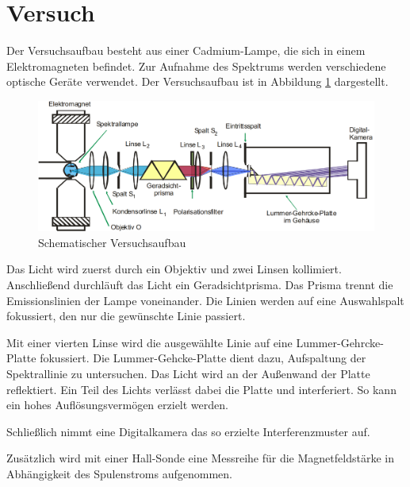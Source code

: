 \section{Versuch}

Der Versuchsaufbau besteht aus einer Cadmium-Lampe, die sich in einem Elektromagneten befindet.
Zur Aufnahme des Spektrums werden verschiedene optische Geräte verwendet.
Der Versuchsaufbau ist in Abbildung \ref{fig:aufbau} dargestellt.

\begin{figure}
	\centering
	\includegraphics[width=\textwidth]{img/aufbau}
	\caption{Schematischer Versuchsaufbau \cite{v27}}
	\label{fig:aufbau}
\end{figure}

Das Licht wird zuerst durch ein Objektiv und zwei Linsen kollimiert.
Anschließend durchläuft das Licht ein Geradsichtprisma.
Das Prisma trennt die Emissionslinien der Lampe voneinander.
Die Linien werden auf eine Auswahlspalt fokussiert, den nur die gewünschte Linie passiert.

Mit einer vierten Linse wird die ausgewählte Linie auf eine Lummer-Gehrcke-Platte fokussiert.
Die Lummer-Gehcke-Platte dient dazu, Aufspaltung der Spektrallinie zu untersuchen.
Das Licht wird an der Außenwand der Platte reflektiert.
Ein Teil des Lichts verlässt dabei die Platte und interferiert.
So kann ein hohes Auflösungsvermögen erzielt werden.

Schließlich nimmt eine Digitalkamera das so erzielte Interferenzmuster auf.

Zusätzlich wird mit einer Hall-Sonde eine Messreihe für die Magnetfeldstärke in Abhängigkeit des Spulenstroms aufgenommen.
